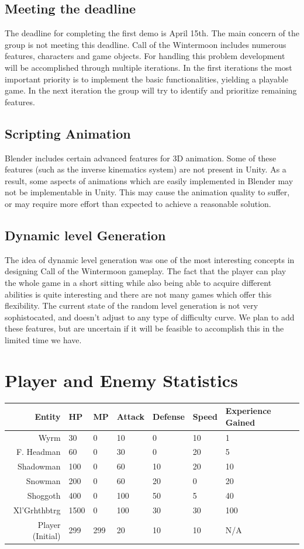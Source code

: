 \documentclass{article}
\begin{document}
\subsection{Meeting the deadline}
The deadline for completing the first demo is April 15th.  The main concern of the group is not meeting this deadline.  Call of the Wintermoon includes numerous features, characters and game objects.  For handling this problem development will be accomplished through multiple iterations.  In the first iterations the most important priority is to implement the basic functionalities, yielding a playable game.  In the next iteration the group will try to identify and prioritize remaining features.

\subsection{Scripting Animation}
Blender includes certain advanced features for 3D animation.  Some of these features (such as the inverse kinematics system) are not present in Unity.  As a result, some aspects of animations which are easily implemented in Blender may not be implementable in Unity.  This may cause the animation quality to suffer, or may require more effort than expected to achieve a reasonable solution.

\subsection{Dynamic level Generation}
The idea of dynamic level generation was one of the most interesting concepts in designing Call of the Wintermoon gameplay.  The fact that the player can play the whole game in a short sitting while also being able to acquire different abilities is quite interesting and there are not many games which offer this flexibility.  The current state of the random level generation is not very sophistocated, and doesn't adjust to any type of difficulty curve.  We plan to add these features, but are uncertain if it will be feasible to accomplish this in the limited time we have.


\label{StatsSection}
\section{Player and Enemy Statistics}

\begin{tabular}{|r|l|l|l|l|l|l|}
\hline
Entity & HP & MP & Attack & Defense & Speed & Experience Gained\\
\hline
Wyrm&30&0&10&0&10&1\\
F. Headman&60&0&30&0&20&5\\
Shadowman&100&0&60&10&20&10\\
Snowman&200&0&60&20&0&20\\
Shoggoth&400&0&100&50&5&40\\
Xl'Grhthbtrg&1500&0&100&30&30&100\\
Player (Initial)&299&299&20&10&10&N/A\\
\hline

\end{tabular}
\end{document}

